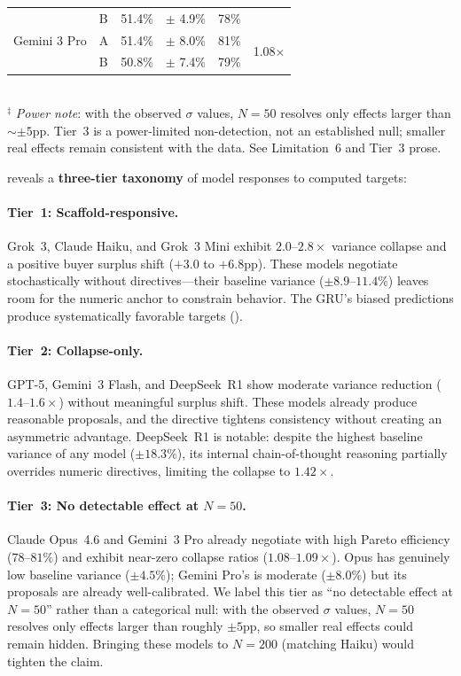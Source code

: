 \documentclass[11pt,a4paper]{article}
\begin{document}
\begin{table}[t]
\begin{tabular}{llcccc}
 & B & 51.4\% & $\pm$ 4.9\% & 78\% & \\[2pt]
Gemini 3 Pro & A & 51.4\% & $\pm$ 8.0\% & 81\% & \multirow{2}{*}{1.08$\times$} \\
 & B & 50.8\% & $\pm$ 7.4\% & 79\% & \\[2pt]
\bottomrule
\end{tabular}\\[0.4em]
\footnotesize $^{\ddagger}$ \emph{Power note}: with the observed $\sigma$ values, $N\!=\!50$ resolves only effects larger than ${\sim}\pm 5$pp. Tier~3 is a power-limited non-detection, not an established null; smaller real effects remain consistent with the data. See Limitation~6 and  Tier~3 prose.
\end{table}

 reveals a \textbf{three-tier taxonomy} of model responses to computed targets:

\paragraph{Tier~1: Scaffold-responsive.} Grok~3, Claude Haiku, and Grok~3 Mini exhibit $2.0$--$2.8\times$ variance collapse and a positive buyer surplus shift ($+3.0$ to $+6.8$pp). These models negotiate stochastically without directives---their baseline variance ($\pm 8.9$--$11.4\%$) leaves room for the numeric anchor to constrain behavior. The GRU's biased predictions produce systematically favorable targets ().

\paragraph{Tier~2: Collapse-only.} GPT-5, Gemini~3 Flash, and DeepSeek~R1 show moderate variance reduction ($1.4$--$1.6\times$) without meaningful surplus shift. These models already produce reasonable proposals, and the directive tightens consistency without creating an asymmetric advantage. DeepSeek~R1 is notable: despite the highest baseline variance of any model ($\pm 18.3\%$), its internal chain-of-thought reasoning partially overrides numeric directives, limiting the collapse to $1.42\times$.

\paragraph{Tier~3: No detectable effect at $N=50$.} Claude Opus~4.6 and Gemini~3 Pro already negotiate with high Pareto efficiency ($78$--$81\%$) and exhibit near-zero collapse ratios ($1.08$--$1.09\times$). Opus has genuinely low baseline variance ($\pm 4.5\%$); Gemini Pro's is moderate ($\pm 8.0\%$) but its proposals are already well-calibrated. We label this tier as ``no detectable effect at $N=50$'' rather than a categorical null: with the observed $\sigma$ values, $N=50$ resolves only effects larger than roughly $\pm 5$pp, so smaller real effects could remain hidden. Bringing these models to $N=200$ (matching Haiku) would tighten the claim.
\end{document}
